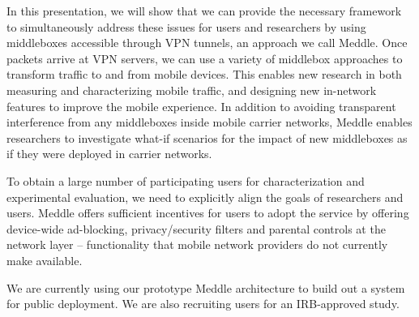 \documentclass[10pt]{article}
\newcommand{\meddle}{{Meddle}\xspace}
\begin{document}
In this presentation, we will show that we can provide the necessary
framework to simultaneously address these issues for users and
researchers by using middleboxes accessible through VPN tunnels, an
approach we call \meddle. Once packets arrive at VPN servers, we can
use a variety of middlebox approaches to transform traffic to and from
mobile devices. This enables new research in both measuring and 
characterizing mobile traffic, and designing new in-network features
to improve the mobile experience. In addition to avoiding transparent
interference from any middleboxes inside mobile carrier networks,
\meddle enables researchers to investigate what-if scenarios for the
impact of new middleboxes as if they were deployed in carrier
networks.
  
To obtain a large number of participating users for characterization
and experimental evaluation, we need to explicitly align the goals of
researchers and users. \meddle offers sufficient
incentives for users to adopt the service by offering device-wide
ad-blocking, privacy/security filters and parental controls at the
network layer -- functionality that mobile network providers do not
currently make available. 

We are currently using our prototype \meddle architecture to build out
a system for public deployment. We are also recruiting users for an
IRB-approved study. 



\begin{scriptsize}

\end{scriptsize}
\end{document}
